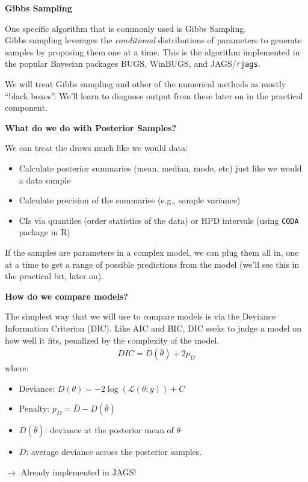 \documentclass[12pt,xcolor=svgnames]{beamer}
\newcommand{\rd}{\color{red}}
\newcommand{\bl}{\color{blue}}
\newcommand{\theme}{\color{FireBrick}}
\newcommand{\sk}{\vspace{.4cm}}
\newcommand{\chap}[1]{{\theme \Large \bf #1} \sk}
\begin{document}
\begin{frame}
\chap{Gibbs Sampling}

One specific algorithm that is commonly used is {\bl Gibbs Sampling}. \\

\sk
Gibbs sampling leverages the {\em conditional} distributions of parameters to generate samples by proposing them one at a time. This is the algorithm implemented in the popular Bayesian packages {\sf BUGS}, {\sf WinBUGS}, and {\sf JAGS}/{\tt rjags}. 

\sk 
We will treat Gibbs sampling and other of the numerical methods as mostly ``black boxes''. We'll learn to diagnose output from these later on in the practical component.


\end{frame}


\begin{frame}
\chap{What do we do with Posterior Samples?}

We can treat the draws much like we would data:
\begin{itemize}
\item Calculate posterior summaries (mean, median, mode, etc) just like we would a data sample
\item Calculate precision of the summaries (e.g., sample variance)
\item CIs via quantiles (order statistics of the data) or HPD intervals (using {\tt CODA} package in R)
\end{itemize}

If the samples are parameters in a complex model, we can plug them all in, one at a time to get a range of possible predictions from the model (we'll see this in the practical bit, later on). 

\end{frame}

\begin{frame}
\chap{How do we compare models?}

The simplest way that we will use to compare models is via the {\bl Deviance Information Criterion} (DIC). Like AIC and BIC, DIC seeks to judge a model on how well it fits, penalized by the complexity of the model.
\begin{align*}
DIC = D(\bar{\theta}) + 2p_D
\end{align*}
where:
\begin{itemize}
\item Deviance: $D(\theta)=-2\log(\mathcal{L}(\theta; y)) + C$
\item Penalty: $p_D = \bar{D} -D(\bar{\theta})$
\item $D(\bar{\theta})$: deviance at the posterior mean of $\theta$
\item $\bar{D}$: average deviance across the posterior samples.
\end{itemize}
{\rd $\rightarrow$ Already implemented in JAGS!}
\end{frame}

\fi
\end{document}
